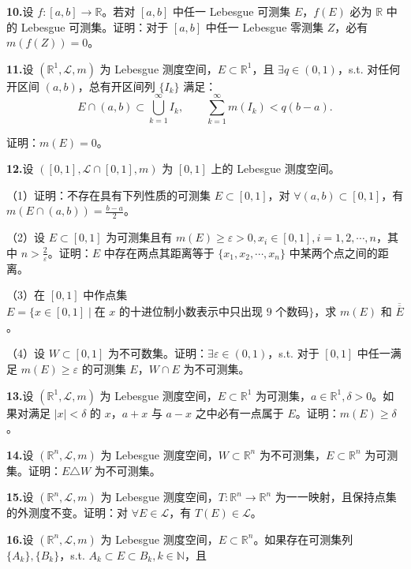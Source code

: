 \documentclass[11pt,a4paper]{article}
\begin{document}
\par{}\noindent\textbf{10.}\quad 设 $f:[a,b]\to\mathbb R$。若对 $[a,b]$ 中任一 Lebesgue 可测集 $E$，$f(E)$ 必为 $\mathbb R$ 中的 Lebesgue 可测集。证明：对于 $[a,b]$ 中任一 Lebesgue 零测集 $Z$，必有 $m(f(Z))=0$。
\par{}\noindent\textbf{11.}\quad 设 $(\mathbb R^1,\mathcal L,m)$ 为 Lebesgue 测度空间，$E\subset\mathbb R^1$，且 $\exists q\in(0,1)$，s.t. 对任何开区间 $(a,b)$，总有开区间列 $\{I_k\}$ 满足：
\[E\cap(a,b)\subset\bigcup_{k=1}^\infty I_k,\qquad\sum_{k=1}^\infty m(I_k)<q(b-a).\]
\par\noindent 证明：$m(E)=0$。
\par{}\noindent\textbf{12.}\quad 设 $([0,1],\mathcal L\cap[0,1],m)$ 为 $[0,1]$ 上的 Lebesgue 测度空间。
\par\noindent （1）证明：不存在具有下列性质的可测集 $E\subset[0,1]$，对 $\forall(a,b)\subset[0,1]$，有 $m(E\cap(a,b))=\frac{b-a}{2}$。
\par\noindent （2）设 $E\subset[0,1]$ 为可测集且有 $m(E)\geq\varepsilon>0,x_i\in[0,1],i=1,2,\cdots,n$，其中 $n>\frac2\varepsilon$。证明：$E$ 中存在两点其距离等于 $\{x_1,x_2,\cdots,x_n\}$ 中某两个点之间的距离。
\par\noindent （3）在 $[0,1]$ 中作点集 $E=\{x\in[0,1]\mid\text{在 }x\text{ 的十进位制小数表示中只出现 9 个数码}\}$，求 $m(E)$ 和 $\overline{\overline E}$。
\par\noindent （4）设 $W\subset[0,1]$ 为不可数集。证明：$\exists\varepsilon\in(0,1)$，s.t. 对于 $[0,1]$ 中任一满足 $m(E)\geq\varepsilon$ 的可测集 $E$，$W\cap E$ 为不可测集。
\par{}\noindent\textbf{13.}\quad 设 $(\mathbb R^1,\mathcal L,m)$ 为 Lebesgue 测度空间，$E\subset\mathbb R^1$ 为可测集，$a\in\mathbb R^1,\delta>0$。如果对满足 $|x|<\delta$ 的 $x$，$a+x$ 与 $a-x$ 之中必有一点属于 $E$。证明：$m(E)\geq\delta$。
\par{}\noindent\textbf{14.}\quad 设 $(\mathbb R^n,\mathcal L,m)$ 为 Lebesgue 测度空间，$W\subset\mathbb R^n$ 为不可测集，$E\subset\mathbb R^n$ 为可测集。证明：$E\triangle W$ 为不可测集。
\par{}\noindent\textbf{15.}\quad 设 $(\mathbb R^n,\mathcal L,m)$ 为 Lebesgue 测度空间，$T:\mathbb R^n\to\mathbb R^n$ 为一一映射，且保持点集的外测度不变。证明：对 $\forall E\in\mathcal L$，有 $T(E)\in\mathcal L$。
\par{}\noindent\textbf{16.}\quad 设 $(\mathbb R^n,\mathcal L,m)$ 为 Lebesgue 测度空间，$E\subset\mathbb R^n$。如果存在可测集列 $\{A_k\},\{B_k\}$，s.t. $A_k\subset E\subset B_k,k\in\mathbb N$，且
\end{document}

